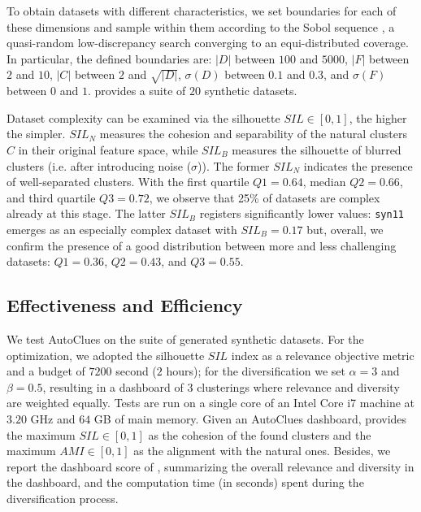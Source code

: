 To obtain datasets with different characteristics, we set boundaries for each of these dimensions and sample within them according to the Sobol sequence \cite{sobol1967distribution}, a quasi-random low-discrepancy search converging to an equi-distributed coverage.
In particular, the defined boundaries are: $|D|$ between $100$ and $5000$, $|F|$ between $2$ and $10$, $|C|$ between $2$ and $\sqrt{|D|}$, $\sigma(D)$ between $0.1$ and $0.3$, and $\sigma(F)$ between $0$ and $1$.
 provides a suite of $20$ synthetic datasets.

Dataset complexity can be examined via the silhouette $SIL \in [0, 1]$, the higher the simpler.
$SIL_N$ measures the cohesion and separability of the natural clusters $C$ in their original feature space, while  $SIL_B$ measures the silhouette of blurred clusters (i.e. after introducing noise ($\sigma$)).
The former $SIL_N$ indicates the presence of well-separated clusters.
With the first quartile $Q1=0.64$, median $Q2=0.66$, and third quartile $Q3=0.72$, we observe that 25\% of datasets are complex already at this stage.
The latter $SIL_B$ registers significantly lower values: \texttt{syn11} emerges as an especially complex dataset with $SIL_B=0.17$ but, overall, we confirm the presence of a good distribution between more and less challenging datasets: $Q1 = 0.36$, $Q2 = 0.43$, and $Q3 = 0.55$.

\subsection{Effectiveness and Efficiency}
\label{clustering-ssec:effectiveness}


We test AutoClues on the suite of generated synthetic datasets.
For the optimization, we adopted the silhouette $SIL$ index as a relevance objective metric and a budget of $7200$ second ($2$ hours); for the diversification we set $\alpha=3$ and $\beta=0.5$, resulting in a dashboard of $3$ clusterings where relevance and diversity are weighted equally.
Tests are run on a single core of an Intel Core i7 machine at $3.20$ GHz and $64$ GB of main memory.
Given an AutoClues dashboard,  provides the maximum $SIL\in [0, 1]$ as the cohesion of the found clusters and the maximum $AMI \in [0, 1]$ as the alignment with the natural ones. Besides, we report the dashboard score of , summarizing the overall relevance and diversity in the dashboard, and the computation time (in seconds) spent during the diversification process. 

